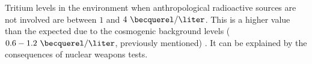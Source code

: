 








Tritium levels in the environment when anthropological radioactive sources are not involved are between $1$ and $4~\becquerel/\liter$. This is a higher value than the expected due to the cosmogenic background levels ($0.6-1.2~\becquerel/\liter$, previously mentioned) \cite{FranceTritiumEnvironment}. It can be explained by the consequences of nuclear weapons tests.

